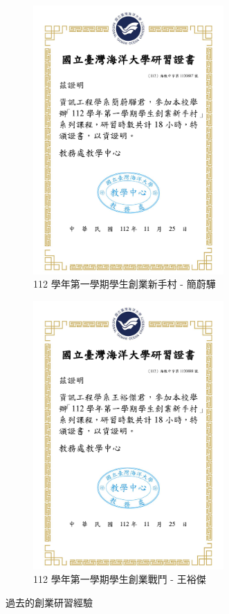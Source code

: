 \begin{figure}[H]
\begin{subfigure}{0.32\linewidth}
    \includegraphics[width=0.8\textwidth]{images/training-2.png}
    \caption{112 學年第一學期學生創業新手村 - 簡蔚驊}
    \label{fig:Training-2}
  \end{subfigure}
  \begin{subfigure}{0.32\linewidth}
    \centering
    \includegraphics[width=0.8\textwidth]{images/training-3.png}
    \caption{112 學年第一學期學生創業戰鬥 - 王裕傑}
    \label{fig:Training-3}
  \end{subfigure}
  \caption{過去的創業研習經驗}
\end{figure}

